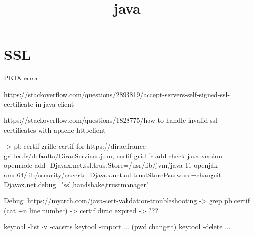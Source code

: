 


\title{java}


\date{}


\maketitle

\justify

\renewcommand{\abstractname}{}

\begin{abstract}

\end{abstract}


\section*{SSL}

PKIX error

https://stackoverflow.com/questions/2893819/accept-servers-self-signed-ssl-certificate-in-java-client

https://stackoverflow.com/questions/1828775/how-to-handle-invalid-ssl-certificates-with-apache-httpclient

-> pb certif grille
certif for https://dirac.france-grilles.fr/defaults/DiracServices.json, certif grid fr
add check java version openmole
add -Djavax.net.ssl.trustStore=/usr/lib/jvm/java-11-openjdk-amd64/lib/security/cacerts -Djavax.net.ssl.trustStorePassword=changeit -Djavax.net.debug="ssl,handshake,trustmanager"

Debug: https://myarch.com/java-cert-validation-troubleshooting
-> grep pb certif 
(cat +n line number)
-> certif dirac expired -> ???

keytool -list -v -cacerts
keytool -import ... (pwd changeit)
keytool -delete ...





%
%



